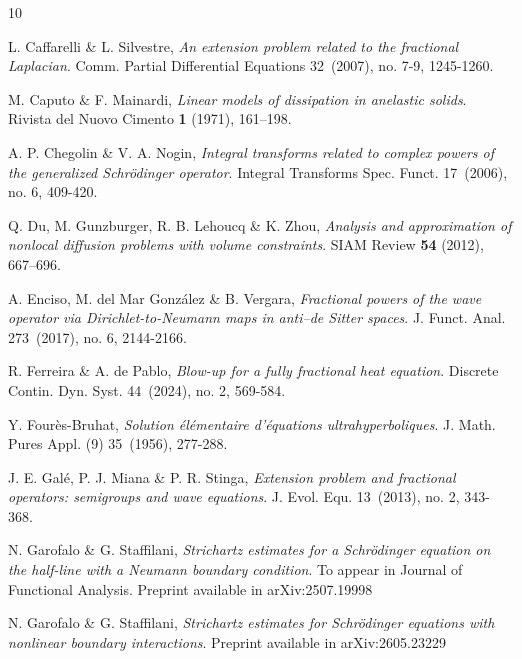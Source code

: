 \documentclass[11pt,letter]{amsart}
\numberwithin{equation}{section}
\numberwithin{equation}{section}
\begin{document}












\begin{thebibliography}{10}

L. Caffarelli \& L. Silvestre, \emph{An extension problem related to the fractional Laplacian}.
Comm. Partial Differential Equations 32~(2007), no. 7-9, 1245-1260.

M. Caputo \& F. Mainardi,
\emph{Linear models of dissipation in anelastic solids}. Rivista del Nuovo Cimento \textbf{1} (1971), 161--198.

A. P. Chegolin \& V. A. Nogin, 
\emph{Integral transforms related to complex powers of the generalized Schr\"odinger operator}.
Integral Transforms Spec. Funct. 17~(2006), no. 6, 409-420.

Q. Du, M. Gunzburger, R. B. Lehoucq \& K. Zhou,
\emph{Analysis and approximation of nonlocal diffusion problems with volume constraints}. SIAM Review \textbf{54} (2012), 667--696.

A. Enciso, M. del Mar Gonz\'alez \& B. Vergara, \emph{
Fractional powers of the wave operator via Dirichlet-to-Neumann maps in anti–de Sitter spaces}.
J. Funct. Anal. 273~(2017), no. 6, 2144-2166.

 R. Ferreira \& A. de Pablo, \emph{Blow-up for a fully fractional heat equation}.
Discrete Contin. Dyn. Syst. 44~(2024), no. 2, 569-584.

Y. Four\`es-Bruhat,  \emph{Solution \'el\'ementaire d'\'equations ultrahyperboliques}.
J. Math. Pures Appl. (9) 35~(1956), 277-288.

J. E. Gal\'e, P. J. Miana \& P. R. Stinga,
\emph{Extension problem and fractional operators: semigroups and wave equations}.
J. Evol. Equ. 13~(2013), no. 2, 343-368.

N. Garofalo \& G. Staffilani, \emph{Strichartz estimates for a Schr\"odinger equation on the half-line with a Neumann boundary condition}. To appear in Journal of Functional Analysis. Preprint available in arXiv:2507.19998

N. Garofalo \& G. Staffilani, \emph{Strichartz estimates for Schr\"odinger equations with nonlinear boundary interactions}. Preprint available in arXiv:2605.23229


\end{thebibliography}
\end{document}
